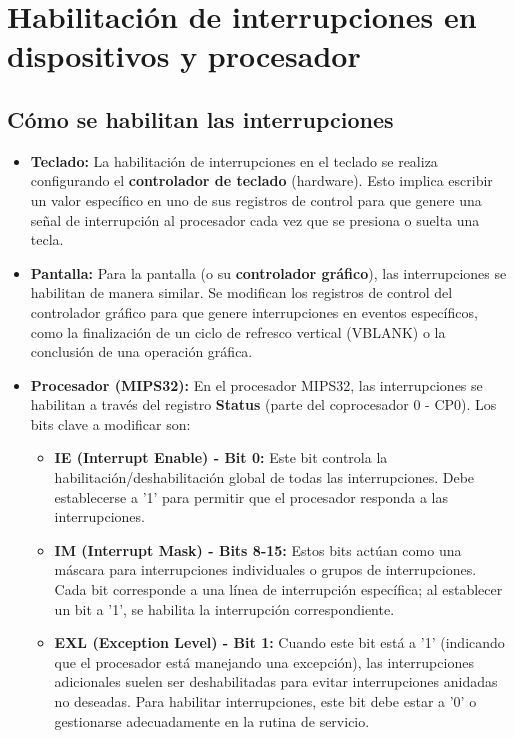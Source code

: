 \documentclass[12pt,a4paper]{article}
\begin{document}
	
	\section{Habilitación de interrupciones en dispositivos y procesador}
	
	\subsection{Cómo se habilitan las interrupciones}
	
	\begin{itemize}
		\item \textbf{Teclado:} La habilitación de interrupciones en el teclado se realiza configurando el \textbf{controlador de teclado} (hardware). Esto implica escribir un valor específico en uno de sus registros de control para que genere una señal de interrupción al procesador cada vez que se presiona o suelta una tecla.
		\item \textbf{Pantalla:} Para la pantalla (o su \textbf{controlador gráfico}), las interrupciones se habilitan de manera similar. Se modifican los registros de control del controlador gráfico para que genere interrupciones en eventos específicos, como la finalización de un ciclo de refresco vertical (VBLANK) o la conclusión de una operación gráfica.
		\item \textbf{Procesador (MIPS32):} En el procesador MIPS32, las interrupciones se habilitan a través del registro \textbf{Status} (parte del coprocesador 0 - CP0). Los bits clave a modificar son:
		\begin{itemize}
			\item \textbf{IE (Interrupt Enable) - Bit 0:} Este bit controla la habilitación/deshabilitación global de todas las interrupciones. Debe establecerse a '1' para permitir que el procesador responda a las interrupciones.
			\item \textbf{IM (Interrupt Mask) - Bits 8-15:} Estos bits actúan como una máscara para interrupciones individuales o grupos de interrupciones. Cada bit corresponde a una línea de interrupción específica; al establecer un bit a '1', se habilita la interrupción correspondiente.
			\item \textbf{EXL (Exception Level) - Bit 1:} Cuando este bit está a '1' (indicando que el procesador está manejando una excepción), las interrupciones adicionales suelen ser deshabilitadas para evitar interrupciones anidadas no deseadas. Para habilitar interrupciones, este bit debe estar a '0' o gestionarse adecuadamente en la rutina de servicio.
		\end{itemize}
	\end{itemize}
	
\end{document}
